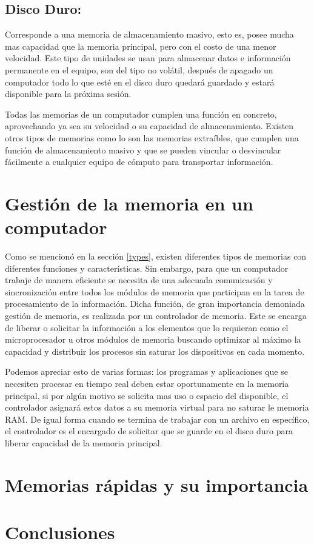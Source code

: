 \documentclass{article}
\begin{document}
\subsection{Disco Duro: }
Corresponde a una memoria de almacenamiento masivo, esto es, posee mucha mas capacidad que la memoria principal, pero con el costo de una menor velocidad. Este tipo de unidades se usan para almacenar datos e información permanente en el equipo, son del tipo no volátil, después de apagado un computador todo lo que esté en el disco duro quedará guardado y estará disponible para la próxima sesión. 

Todas las memorias de un computador cumplen una función en concreto, aprovechando ya sea su velocidad o su capacidad de almacenamiento. Existen otros tipos de memorias como lo son las memorias extraíbles, que cumplen una función de almacenamiento masivo y que se pueden vincular o desvincular fácilmente a cualquier equipo de cómputo para transportar información.

\section{Gestión de la memoria en un computador} \label{working}

Como se mencionó en la sección \ref{types}, existen diferentes tipos de memorias con diferentes funciones y características. Sin embargo, para que un computador trabaje de manera eficiente se necesita de una adecuada comunicación y sincronización entre todos los módulos de memoria que participan en la tarea de procesamiento de la información. Dicha función, de gran importancia demoniada gestión de memoria, es realizada por un controlador de memoria. Este se encarga de liberar o solicitar la información a los elementos que lo requieran como el microprocesador u otros módulos de memoria buscando optimizar al máximo la capacidad y distribuir los procesos sin saturar los dispositivos en cada momento. 

Podemos apreciar esto de varias formas: los programas y aplicaciones que se necesiten procesar en tiempo real deben estar oportunamente en la memoria principal, si por algún motivo se solicita mas uso o espacio del disponible, el controlador asignará estos datos a su memoria virtual para no saturar le memoria RAM. De igual forma cuando se termina de trabajar con un archivo en específico, el controlador es el encargado de solicitar que se guarde en el disco duro para liberar capacidad de la memoria principal. \cite{gestion}

\section{Memorias rápidas y su importancia}


\section{Conclusiones}




\end{document}
